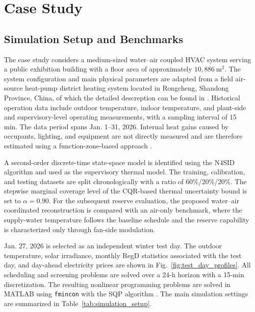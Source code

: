 \documentclass[journal]{IEEEtran}
\theoremstyle{remark}
\begin{document}
	\section{Case Study}
	\label{sec:Case_Study}
	
	\subsection{Simulation Setup and Benchmarks}
	\label{subsec:simulation_setup}
	
	The case study considers a medium-sized water--air coupled HVAC system serving a public exhibition building with a floor area of approximately \(10{,}886~\mathrm{m}^2\). The system configuration and main physical parameters are adapted from a field air-source heat-pump district heating system located in Rongcheng, Shandong Province, China, of which the detailed descreption can be found in \cite{jiang2026modeling}. Historical operation data include outdoor temperature, indoor temperature, and plant-side and supervisory-level operating measurements, with a sampling interval of 15 min. The data period spans Jan. 1--31, 2026. Internal heat gains caused by occupants, lighting, and equipment are not directly measured and are therefore estimated using a function-zone-based approach \cite{wang2006parameter}. 
	
	A second-order discrete-time state-space model is identified using the N4SID algorithm and used as the supervisory thermal model. The training, calibration, and testing datasets are split chronologically with a ratio of 60\%/20\%/20\%. The stepwise marginal coverage level of the CQR-based thermal uncertainty bound is set to \(\alpha=0.90\). For the subsequent reserve evaluation, the proposed water--air coordinated reconstruction is compared with an air-only benchmark, where the supply-water temperature follows the baseline schedule and the reserve capability is characterized only through fan-side modulation.
	
	Jan. 27, 2026 is selected as an independent winter test day. The outdoor temperature, solar irradiance, monthly RegD statistics associated with the test day, and day-ahead electricity prices are shown in Fig.~\ref{fig:test_day_profiles}\cite{PJM_MarketBasedRegulation}. All scheduling and screening problems are solved over a 24-h horizon with a 15-min discretization. The resulting nonlinear programming problems are solved in MATLAB using \texttt{fmincon} with the SQP algorithm \cite{MathWorks_OptimizationToolbox}. The main simulation settings are summarized in Table~\ref{tab:simulation_setup}.
	
\end{document}
